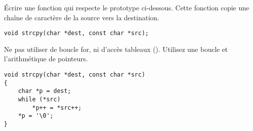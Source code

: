 \documentclass[french,a4paper,addpoints,11pt,answers]{exam}
\begin{document}
\begin{questions}

\question Écrire une fonction qui respecte le prototype ci-dessous. Cette fonction copie une chaîne de caractère de la source vers la destination.

\begin{lstlisting}
void strcpy(char *dest, const char *src);
\end{lstlisting}

Ne pas utiliser de boucle for, ni d'accès tableaux (). Utilisez une boucle  et l'arithmétique de pointeurs.

\begin{solutionordottedlines}[8cm]
\begin{lstlisting}
void strcpy(char *dest, const char *src)
{
    char *p = dest;
    while (*src)
        *p++ = *src++;
    *p = '\0';
}
\end{lstlisting}
\end{solutionordottedlines}

\end{questions}
\end{document}

